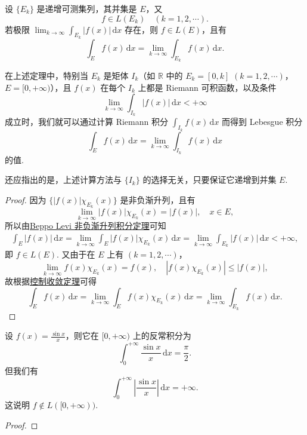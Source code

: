 \documentclass[../../main.tex]{subfiles}%
\begin{document}
\begin{theorem}
设 \( \{ E_k \} \) 是递增可测集列，其并集是 \( E \)，又
\[
f \in L(E_k) \quad (k = 1, 2, \cdots).
\]
若极限 \( \lim_{k \to \infty} \int_{E_k} |f(x)| \, \mathrm{d}x \) 存在，则 \( f \in L(E) \)，且有
\[
\int_E f(x) \, \mathrm{d}x = \lim_{k \to \infty} \int_{E_k} f(x) \, \mathrm{d}x.
\]
\end{theorem}
\begin{remark}
在上述定理中，特别当 \( E_k \) 是矩体 \( I_k \)（如 \( \mathbb{R} \) 中的 \( E_k = [0, k] \) \( (k = 1, 2, \cdots) \)，\( E = [0, +\infty) \)），且 \( f(x) \) 在每个 \( I_k \) 上都是 Riemann 可积函数，以及条件
\[
\lim_{k \to \infty} \int_{I_k} |f(x)| \, \mathrm{d}x < +\infty
\]
成立时，我们就可以通过计算 Riemann 积分 \( \int_{I_k} f(x) \, \mathrm{d}x \) 而得到 Lebesgue 积分
\[
\int_E f(x) \, \mathrm{d}x = \lim_{k \to \infty} \int_{I_k} f(x) \, \mathrm{d}x
\]
的值.

还应指出的是，上述计算方法与 \( \{ I_k \} \) 的选择无关，只要保证它递增到并集 \( E \).
\end{remark}
\begin{proof}

因为 \( \{ |f(x)| \chi_{E_k}(x) \} \) 是非负渐升列，且有
\[
\lim_{k \to \infty} |f(x)| \chi_{E_k}(x) = |f(x)|, \quad x \in E,
\]
所以由\hyperref[theorem:Beppo Levi非负渐升列积分定理]{Beppo Levi 非负渐升列积分定理}可知
\begin{align*}
\int_E |f(x)| \, \mathrm{d}x = \lim_{k \to \infty} \int_E |f(x)| \chi_{E_k}(x) \, \mathrm{d}x = \lim_{k \to \infty} \int_{E_k} |f(x)| \, \mathrm{d}x < +\infty,
\end{align*}
即 \( f \in L(E) \). 又由于在 \( E \) 上有 \( (k = 1, 2, \cdots) \)，
\[
\lim_{k \to \infty} f(x) \chi_{E_k}(x) = f(x), \quad |f(x) \chi_{E_k}(x)| \leqslant |f(x)|,
\]
故根据\hyperref[theorem:控制收敛定理]{控制收敛定理}可得
\[
\int_E{f(x)\,\mathrm{d}x}=\lim_{k\rightarrow \infty} \int_E{f(x)\chi _{E_k}\left( x \right) \,\mathrm{d}x}=\lim_{k\rightarrow \infty} \int_{E_k}{f(x)\,\mathrm{d}x}.
\]

\end{proof}

\begin{example}
设 \( f(x) = \frac{\sin x}{x} \)，则它在 \( [0, +\infty) \) 上的反常积分为
\[
\int_0^{+\infty} \frac{\sin x}{x} \, \mathrm{d}x = \frac{\pi}{2}.
\]
但我们有
\[
\int_0^{+\infty} \left| \frac{\sin x}{x} \right| \, \mathrm{d}x = +\infty.
\]
这说明 \( f \notin L([0, +\infty)) \).
\end{example}
\begin{proof}



\end{proof}
\end{document}
